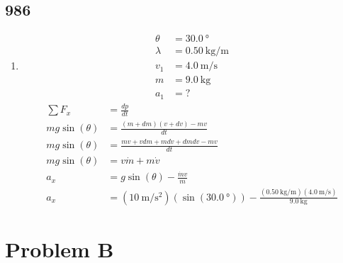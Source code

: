 \documentclass{article}
\begin{document}
\subsection{986}

\begin{enumerate}[label = \textbf{(\alph*)}]
	\item
		\begin{align*}
			\theta & = \SI{30.0}{\degree} \\
			\lambda & = \SI{0.50}{\kilogram \per \meter} \\
			v_1 & = \SI{4.0}{\meter \per \second} \\
			m & = \SI{9.0}{\kilogram} \\
			a_1 & = ?
		\end{align*}
		\begin{align*}
			\sum F_x & = \frac{dp}{dt} \\
			mg\sin(\theta) & = \frac{ (m + dm)(v + dv) - mv }{ dt } \\
			mg\sin(\theta) & = \frac{ mv + vdm + mdv + dmdv - mv }{ dt } \\
			mg\sin(\theta) & = v\dot{m} + m\dot{v} \\
			a_x & = g\sin(\theta) - \frac{ \dot{m}v }{ m } \\
			a_x & = (\SI{10}{\meter \per \second \squared})(\sin(\SI{30.0}{\degree})) - \frac{ (\SI{0.50}{\kilogram \per \meter})(\SI{4.0}{\meter \per \second}) }{ \SI{9.0}{\kilogram} }
		\end{align*}
\end{enumerate}

\section{Problem B}
\end{document}
